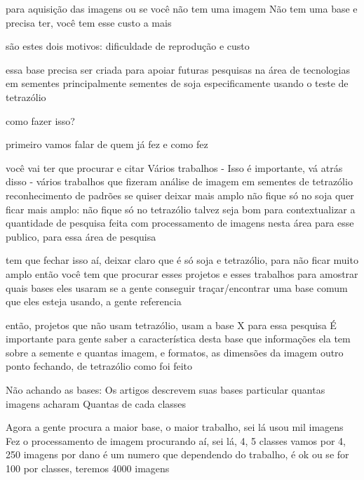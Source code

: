 para aquisição das imagens
ou se você não tem uma imagem
Não tem uma base
e precisa ter, você tem esse custo a mais

são estes dois motivos: dificuldade de reprodução e custo %

essa base precisa ser criada para apoiar futuras pesquisas na área
de tecnologias em sementes principalmente sementes de soja
especificamente usando o teste de tetrazólio

como fazer isso? %

primeiro vamos falar de quem já fez e como fez %

você vai ter que procurar e citar %
Vários trabalhos - {\LARGE Isso é importante, vá atrás disso} -
vários trabalhos que fizeram análise de imagem em sementes
de tetrazólio
reconhecimento de padrões
se quiser deixar mais amplo
não fique só no soja
quer ficar mais amplo: não fique só no tetrazólio
talvez seja bom para contextualizar a quantidade de pesquisa feita
com processamento de imagens nesta área para esse publico, para essa área de pesquisa

tem que fechar isso aí, deixar claro que é só soja e tetrazólio, para não ficar muito amplo
então você tem que procurar esses projetos e esses trabalhos
para amostrar quais bases eles usaram
se a gente conseguir traçar/encontrar
uma base comum que eles esteja usando, a gente referencia

então, projetos que não usam tetrazólio, usam a base X para essa pesquisa
É importante para gente saber a característica desta base
que informações ela tem sobre a semente
e quantas imagem, e formatos, as dimensões da imagem outro ponto
fechando, de tetrazólio como foi feito

Não achando as bases:
Os artigos descrevem suas bases particular
quantas imagens acharam
Quantas de cada classes

Agora a gente procura a maior base, o maior trabalho, sei lá usou mil imagens
Fez o processamento de imagem
procurando aí, sei lá, 4, 5 classes
vamos por 4, 250 imagens por dano
é um numero que dependendo do trabalho, é ok
ou se for 100 por classes, teremos 4000 imagens

